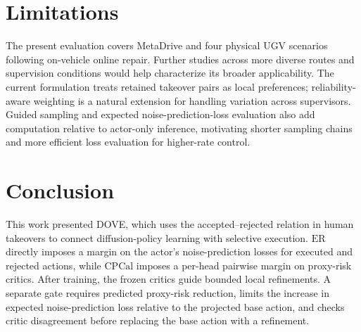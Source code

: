 \documentclass[9pt,journal]{IEEEtran}
\newcommand{\DOVE}{DOVE}
\newcommand{\CPCal}{\ensuremath{\mathrm{CPCal}}}
\newcommand{\ER}{\ensuremath{\mathrm{ER}}}
\begin{document}
\section{Limitations}

The present evaluation covers MetaDrive and four physical UGV scenarios
following on-vehicle online repair. Further studies across more diverse
routes and supervision conditions would help characterize its broader
applicability. The current formulation treats retained takeover pairs as
local preferences; reliability-aware weighting is a natural extension
for handling variation across supervisors. Guided sampling and expected noise-prediction-loss evaluation also add computation relative to actor-only inference, motivating shorter sampling chains and more efficient loss evaluation for higher-rate
control.




\section{Conclusion}
\label{sec:conclusion}

This work presented \DOVE{}, which uses the accepted--rejected relation
in human takeovers to connect diffusion-policy learning with selective
execution. \ER{} directly imposes a margin on the actor's noise-prediction
losses for executed and rejected actions, while \CPCal{} imposes
a per-head pairwise margin on proxy-risk critics. After training, the frozen critics
guide bounded local refinements. A separate gate requires predicted proxy-risk reduction, limits the
increase in expected noise-prediction loss relative to the projected
base action, and checks critic disagreement before replacing the
base action with a refinement.
\end{document}
